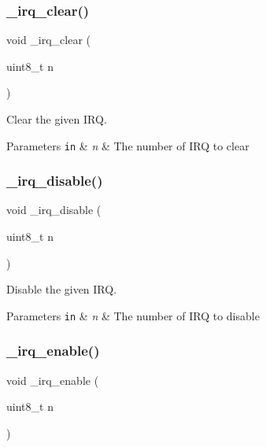 \subsubsection{\texorpdfstring{\+\_\+irq\+\_\+clear()}{\_irq\_clear()}}
{\footnotesize\ttfamily void \+\_\+irq\+\_\+clear (\begin{DoxyParamCaption}\item[{uint8\+\_\+t}]{n }\end{DoxyParamCaption})}



Clear the given I\+RQ. 


\begin{DoxyParams}[1]{Parameters}
\mbox{\tt in}  & {\em n} & The number of I\+RQ to clear \\
\hline
\end{DoxyParams}
\mbox{\label{group___h_p_l_gae6a80cff8a450795dc3f2d6df1a19464}} 
\subsubsection{\texorpdfstring{\+\_\+irq\+\_\+disable()}{\_irq\_disable()}}
{\footnotesize\ttfamily void \+\_\+irq\+\_\+disable (\begin{DoxyParamCaption}\item[{uint8\+\_\+t}]{n }\end{DoxyParamCaption})}



Disable the given I\+RQ. 


\begin{DoxyParams}[1]{Parameters}
\mbox{\tt in}  & {\em n} & The number of I\+RQ to disable \\
\hline
\end{DoxyParams}
\mbox{\label{group___h_p_l_gac8b7aa49ad81aecd34603b4dc23dd143}} 
\subsubsection{\texorpdfstring{\+\_\+irq\+\_\+enable()}{\_irq\_enable()}}
{\footnotesize\ttfamily void \+\_\+irq\+\_\+enable (\begin{DoxyParamCaption}\item[{uint8\+\_\+t}]{n }\end{DoxyParamCaption})}



